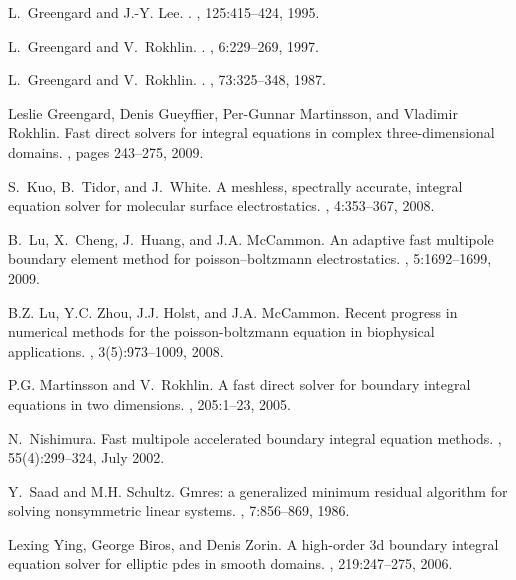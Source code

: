 \documentclass[preprint,12pt]{elsarticle}
\begin{document}
\begin{thebibliography}{10}
L.~Greengard and J.-Y. Lee.
.
, 125:415--424, 1995.

L.~Greengard and V.~Rokhlin.
.
, 6:229--269, 1997.

L.~Greengard and V.~Rokhlin.
.
, 73:325--348, 1987.

Leslie Greengard, Denis Gueyffier, Per-Gunnar Martinsson, and Vladimir Rokhlin.
\newblock Fast direct solvers for integral equations in complex
  three-dimensional domains.
, pages 243--275, 2009.

S.~Kuo, B.~Tidor, and J.~White.
\newblock A meshless, spectrally accurate, integral equation solver for
  molecular surface electrostatics.
, 4:353--367, 2008.

B.~Lu, X.~Cheng, J.~Huang, and J.A. McCammon.
\newblock An adaptive fast multipole boundary element method for
  poisson--boltzmann electrostatics.
, 5:1692--1699, 2009.

B.Z. Lu, Y.C. Zhou, J.J. Holst, and J.A. McCammon.
\newblock Recent progress in numerical methods for the poisson-boltzmann
  equation in biophysical applications.
, 3(5):973--1009, 2008.

P.G. Martinsson and V.~Rokhlin.
\newblock A fast direct solver for boundary integral equations in two
  dimensions.
, 205:1--23, 2005.

N.~Nishimura.
\newblock Fast multipole accelerated boundary integral equation methods.
, 55(4):299--324, July 2002.

Y.~Saad and M.H. Schultz.
\newblock Gmres: a generalized minimum residual algorithm for solving
  nonsymmetric linear systems.
, 7:856--869, 1986.

Lexing Ying, George Biros, and Denis Zorin.
\newblock A high-order 3d boundary integral equation solver for elliptic pdes
  in smooth domains.
, 219:247--275, 2006.

\end{thebibliography}
\end{document}
